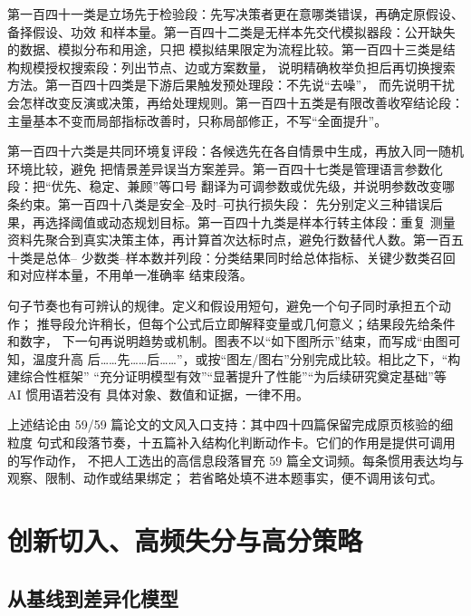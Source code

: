 \documentclass[UTF8,a4paper,12pt]{ctexart}
\begin{document}
第一百四十一类是立场先于检验段：先写决策者更在意哪类错误，再确定原假设、备择假设、功效
和样本量。第一百四十二类是无样本先交代模拟器段：公开缺失的数据、模拟分布和用途，只把
模拟结果限定为流程比较。第一百四十三类是结构规模授权搜索段：列出节点、边或方案数量，
说明精确枚举负担后再切换搜索方法。第一百四十四类是下游后果触发预处理段：不先说“去噪”，
而先说明干扰会怎样改变反演或决策，再给处理规则。第一百四十五类是有限改善收窄结论段：
主量基本不变而局部指标改善时，只称局部修正，不写“全面提升”。

第一百四十六类是共同环境复评段：各候选先在各自情景中生成，再放入同一随机环境比较，避免
把情景差异误当方案差异。第一百四十七类是管理语言参数化段：把“优先、稳定、兼顾”等口号
翻译为可调参数或优先级，并说明参数改变哪条约束。第一百四十八类是安全--及时--可执行损失段：
先分别定义三种错误后果，再选择阈值或动态规划目标。第一百四十九类是样本行转主体段：重复
测量资料先聚合到真实决策主体，再计算首次达标时点，避免行数替代人数。第一百五十类是总体--
少数类--样本数并列段：分类结果同时给总体指标、关键少数类召回和对应样本量，不用单一准确率
结束段落。

句子节奏也有可辨认的规律。定义和假设用短句，避免一个句子同时承担五个动作；
推导段允许稍长，但每个公式后立即解释变量或几何意义；结果段先给条件和数字，
下一句再说明趋势或机制。图表不以“如下图所示”结束，而写成“由图可知，温度升高
后……先……后……”，或按“图左/图右”分别完成比较。相比之下，“构建综合性框架”
“充分证明模型有效”“显著提升了性能”“为后续研究奠定基础”等 AI 惯用语若没有
具体对象、数值和证据，一律不用。

上述结论由 59/59 篇论文的文风入口支持：其中四十四篇保留完成原页核验的细粒度
句式和段落节奏，十五篇补入结构化判断动作卡。它们的作用是提供可调用的写作动作，
不把人工选出的高信息段落冒充 59 篇全文词频。每条惯用表达均与观察、限制、动作或结果绑定；
若省略处填不进本题事实，便不调用该句式。

\section{创新切入、高频失分与高分策略}

\subsection{从基线到差异化模型}
\end{document}
